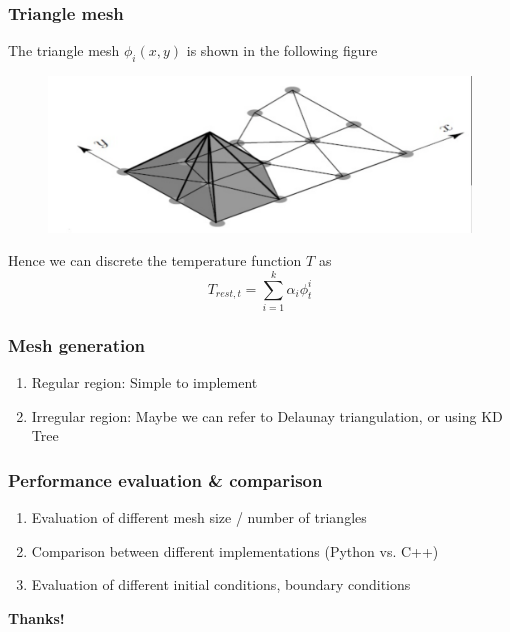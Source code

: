 \documentclass{beamer}
\begin{document}
\begin{frame}
    \frametitle{Triangle mesh}
    The triangle mesh $\phi_i(x, y)$ is shown in the following figure
    \begin{figure}[H]
        \includegraphics[scale=0.4]{mesh.png}
    \end{figure}
    Hence we can discrete the temperature function $T$ as 
    $$T_{rest, t} = \sum_{i=1}^{k}\alpha_i\phi^{i}_{t}$$
\end{frame}

\begin{frame}
    \frametitle{Mesh generation}
    \begin{enumerate}
        \item Regular region: Simple to implement
        \item Irregular region: Maybe we can refer to Delaunay triangulation, or using KD Tree
    \end{enumerate}
\end{frame}

\begin{frame}
    \frametitle{Performance evaluation \& comparison}
    \begin{enumerate}
        \item Evaluation of different mesh size / number of triangles
        \item Comparison between different implementations (Python vs. C++)
        \item Evaluation of different initial conditions, boundary conditions
    \end{enumerate}
\end{frame}

\begin{frame}
    {\centering\begin{center}
            \bf \Huge  Thanks!
        \end{center} }
\end{frame}
\end{document}
